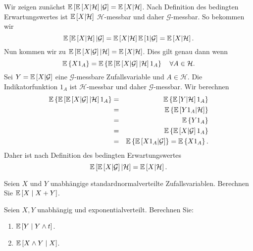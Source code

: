 \solution Wir zeigen zunächst 
$\mathbb{E}\left[ \mathbb{E}\left[ X | \mathcal H \right] | \mathcal G \right]=\mathbb{E} \left[ X | \mathcal H \right]$.
Nach Definition des bedingten Erwartungswertes ist $\mathbb{E}\left[ X| \mathcal H \right]$ 
$\mathcal H$-messbar und daher $\mathcal G$-messbar. So bekommen wir 
\begin{equation}
	\mathbb{E}\left[ \mathbb{E}\left[ X | \mathcal H \right] | \mathcal G \right] =
	\mathbb{E}\left[ X| \mathcal H \right] \mathbb{E}\left[ 1|\mathcal G \right] = 
	\mathbb{E} \left[ X | \mathcal H \right ].
\end{equation}
Nun kommen wir zu 
$\mathbb{E}\left[ \mathbb{E}\left[ X | \mathcal G \right] | \mathcal H \right]=\mathbb{E} \left[ X | \mathcal H \right]$.
Dies gilt genau dann wenn 
\begin{equation}
	\mathbb{E}\left\{ X 1_A \right\} 
	= \mathbb{E}\left\{ \mathbb{E}\left[ \mathbb{E}\left[ X|\mathcal G \right]|\mathcal H \right] 1_A \right\}  
	\quad \forall A\in\mathcal H.
\end{equation}
Sei $Y=\mathbb{E}\left[ X|\mathcal G \right]$ eine $\mathcal G$-messbare Zufallsvariable und
$A\in\mathcal H$. Die Indikatorfunktion $1_A$ ist $\mathcal H$-messbar und daher
$\mathcal G$-messbar. Wir berechnen
\begin{eqnarray}
	\mathbb{E}\left\{ \mathbb{E}\left[ \mathbb{E}\left[ X|\mathcal G \right]|\mathcal H \right] 1_A \right\} &=& 
	\mathbb{E}\left\{ \mathbb{E}\left[ Y|\mathcal H \right] 1_A \right\} \\
	&=& \mathbb{E}\left\{ \mathbb{E}\left[ Y 1_A| \mathcal H \right] \right\} \\
	&=& \mathbb{E}\left\{ Y 1_A \right\} \\
	&=& \mathbb{E}\left\{ \mathbb{E}\left[ X|\mathcal G \right] 1_A \right\} \\
	&=& \mathbb{E}\left\{ \mathbb{E}\left[ X 1_A| \mathcal G \right] \right\} = \mathbb{E}\left\{ X 1_A \right\}. 
\end{eqnarray}
Daher ist nach Definition des bedingten Erwartungswertes
\begin{equation}
	\mathbb{E}\left[ \mathbb{E}\left[ X | \mathcal G \right] | \mathcal H \right]=\mathbb{E} \left[ X | \mathcal H \right].
\end{equation}



 Seien $X$ und $Y$ unabhängige
standardnormalverteilte Zufallsvariablen. Berechnen Sie $\mathbb{E}\left[ X \;\middle\vert\; X+Y
\right]$.


 Seien $X,Y$ unabhängig
und exponentialverteilt. Berechnen Sie:
\begin{enumerate}
    \item $\mathbb{E}\left[ Y \;\middle\vert\; Y \wedge t \right]$.
    \item $\mathbb{E} \left[ X \wedge Y \;\middle\vert\; X \right]$.
\end{enumerate}


